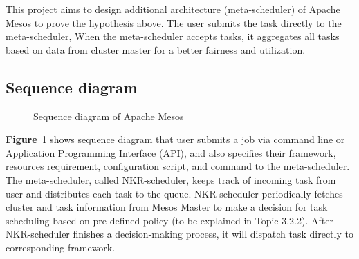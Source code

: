\documentclass[12pt,oneside,openright,a4paper]{cpe-english-project}
\begin{document}
\hspace{10mm}This project aims to design additional architecture (meta-scheduler) of Apache Mesos to prove the hypothesis above. The user submits the task directly to the meta-scheduler, When the meta-scheduler accepts tasks, it aggregates all tasks based on data from cluster master for a better fairness and utilization.

\subsection{Sequence diagram} 
\begin{figure}[!h]\centering
  \setlength{\fboxrule}{0mm} %
  \setlength{\fboxsep}{0cm}
  \caption{Sequence diagram of Apache Mesos}\label{fig:SequenceDiagram}
\end{figure}

\hspace{10mm}\textbf{Figure}~\ref{fig:SequenceDiagram} shows sequence diagram that user submits a job via command line or Application Programming Interface (API), and also specifies their framework, resources requirement, configuration script, and command to the meta-scheduler. The meta-scheduler, called NKR-scheduler, keeps track of incoming task from user and distributes each task to the queue. NKR-scheduler periodically fetches cluster and task information from Mesos Master to make a decision for task scheduling based on pre-defined policy (to be explained in Topic 3.2.2).  After NKR-scheduler finishes a decision-making process, it will dispatch task directly to corresponding framework.
\end{document}
